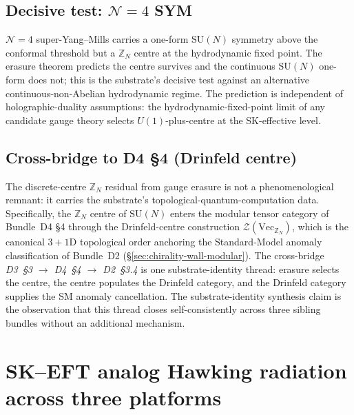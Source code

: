 \documentclass[aps,prd,reprint,nofootinbib,superscriptaddress]{revtex4-2}
\begin{document}
\subsection{Decisive test: $\mathcal{N}=4$ SYM}

$\mathcal{N}=4$ super-Yang--Mills carries a one-form $\mathrm{SU}(N)$
symmetry above the conformal threshold but a $\mathbb{Z}_N$ centre at
the hydrodynamic fixed point. The erasure theorem predicts the centre
survives and the continuous $\mathrm{SU}(N)$ one-form does not; this
is the substrate's decisive test against an alternative
continuous-non-Abelian hydrodynamic regime. The prediction is
independent of holographic-duality assumptions: the
hydrodynamic-fixed-point limit of any candidate gauge theory selects
$U(1)$-plus-centre at the SK-effective level.

\subsection{Cross-bridge to D4 \S 4 (Drinfeld centre)}

The discrete-centre $\mathbb{Z}_N$ residual from gauge erasure is
not a phenomenological remnant: it carries the substrate's
topological-quantum-computation data. Specifically, the $\mathbb{Z}_N$
centre of $\mathrm{SU}(N)$ enters the modular tensor category of
Bundle~D4 \S 4 through the Drinfeld-centre construction
$\mathcal{Z}(\mathrm{Vec}_{\mathbb{Z}_N})$, which is the canonical
$3+1$D topological order anchoring the Standard-Model anomaly
classification of Bundle~D2 (\S\ref{sec:chirality-wall-modular}).
The cross-bridge \emph{D3~\S 3 $\to$ D4~\S 4 $\to$ D2~\S 3.4} is one
substrate-identity thread: erasure selects the centre, the centre
populates the Drinfeld category, and the Drinfeld category supplies
the SM anomaly cancellation. The substrate-identity synthesis claim
is the observation that this thread closes self-consistently across
three sibling bundles without an additional mechanism.


\section{SK--EFT analog Hawking radiation across three platforms}
\label{sec:analog-hawking}
\end{document}
